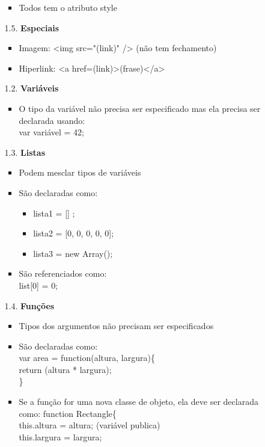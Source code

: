 \documentclass[12pt, a4paper]{article} %
\begin{document}
\begin{enumerate}
\begin{enumerate}
\begin{itemize}
\item Todos tem o atributo style
\end{itemize}
\item[1.5.] \textbf{Especiais}
\begin{itemize}
\item Imagem: <img src="(link)" /> (não tem fechamento)
\item Hiperlink: <a href=(link)>(frase)</a>
\end{itemize}
\item[1.2.] \textbf{Variáveis} 
\begin{itemize}
\item O tipo da variável não precisa ser especificado mas ela precisa ser declarada usando:\\
var variável = 42;
\end{itemize}
\item[1.3.] \textbf{Listas}
\begin{itemize}
\item Podem mesclar tipos de variáveis
\item São declaradas como: 
\begin{itemize}
\item lista1 = [] ;
\item lista2 = [0, 0, 0, 0, 0];
\item lista3 = new Array();
\end{itemize}
\item São referenciados como: \\
list[0] = 0;
\end{itemize}
\item[1.4.] \textbf{Funções}
\begin{itemize}
\item Tipos dos argumentos não precisam ser especificados
\item São declaradas como: \\
var area = function(altura, largura)\{ \\[-0.5cm]

\setlength{\parindent}{1cm} return (altura * largura);\\
\}
\item Se a função for uma nova classe de objeto, ela deve ser declarada como:
function Rectangle\{ \\[-0.5cm]

\setlength{\parindent}{1cm} this.altura = altura; (variável publica)\\[-0.5cm]

\setlength{\parindent}{1cm} this.largura = largura;\\[-0.5cm]


\end{itemize}
\end{enumerate}
\end{enumerate}
\end{document}
